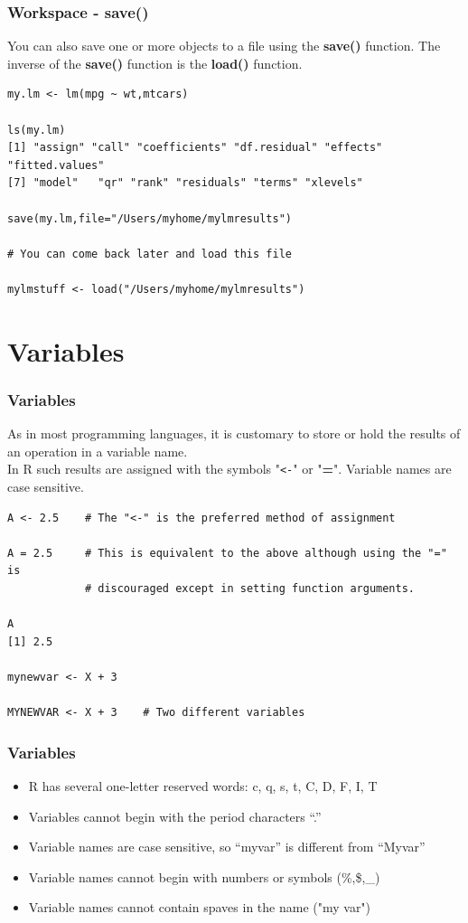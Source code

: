 \documentclass{beamer}
\begin{document}
\begin{frame}[fragile]
\frametitle{Workspace - save()}
You can also save one or more objects to a file using the \textbf{save()} function. The inverse of the \textbf{save()} function is the \textbf{load()} function.
\footnotesize
\begin{verbatim}
my.lm <- lm(mpg ~ wt,mtcars)

ls(my.lm)
[1] "assign" "call" "coefficients" "df.residual" "effects" "fitted.values" 
[7] "model"   "qr" "rank" "residuals" "terms" "xlevels"

save(my.lm,file="/Users/myhome/mylmresults")

# You can come back later and load this file

mylmstuff <- load("/Users/myhome/mylmresults")
\end{verbatim}
\end{frame}



\section{Variables}

\begin{frame}[fragile]
\frametitle{Variables}
As in most programming languages, it is customary to store or hold the results of an operation
in a variable name. 
\newline
\\
In R such results are assigned with the symbols "\texttt{<-}" or "\textbf{=}". Variable names are case sensitive.
\footnotesize
\begin{verbatim}
A <- 2.5    # The "<-" is the preferred method of assignment

A = 2.5     # This is equivalent to the above although using the "=" is 
            # discouraged except in setting function arguments.

A
[1] 2.5

mynewvar <- X + 3

MYNEWVAR <- X + 3    # Two different variables

\end{verbatim}
\end{frame}


\begin{frame}[fragile]
\frametitle{Variables}
\begin{itemize}
\item R has several one-letter reserved words: c, q, s, t, C, D, F, I, T
\item Variables cannot begin with the period characters ``.''
\item Variable names are case sensitive, so ``myvar'' is different from ``Myvar''
\item Variable names cannot begin with numbers or symbols (\%,\$,\_)
\item Variable names cannot contain spaves in the name ("my var")
\end{itemize}

\end{frame}
\end{document}
